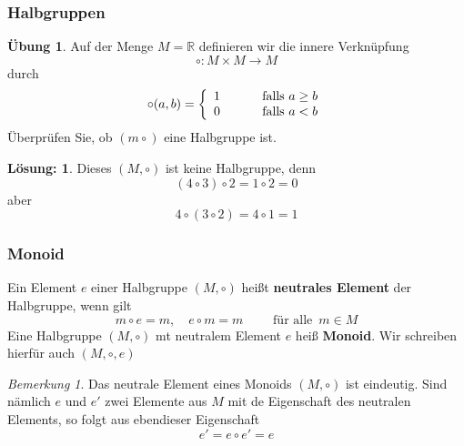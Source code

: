 \documentclass[hyperref={pdfpagelabels=false}]{beamer}
\theoremstyle{plain}%
\theoremstyle{definition}
\newtheorem*{uebung}{Übung}
\newtheorem*{sol}{Lösung:}
\theoremstyle{remark}
\newtheorem*{notiz}{Bemerkung}
\begin{document}
\begin{frame}
\frametitle{Halbgruppen}

\begin{uebung}
Auf der Menge $M = \mathbb R$ definieren wir die innere Verknüpfung
  	$$ \circ : M \times M \longrightarrow M $$
durch 
  	$$ \circ(a,b) = \left\{ \begin{array}{l c l} 1 & \quad & \textrm{ falls } a \geq b \\
	0 & & \textrm{ falls } a < b \end{array} \right. $$
Überprüfen Sie, ob $(m \circ)$ eine Halbgruppe ist.
\end{uebung}

\bigbreak

\pause \pause 

\begin{sol}
Dieses $(M, \circ )$ ist keine Halbgruppe, denn 
	$$ (4 \circ 3) \circ 2 = 1 \circ 2 = 0 $$
aber 
	$$ 4 \circ (3 \circ 2) = 4 \circ 1 = 1 $$ 
\end{sol}

\end{frame}

\begin{frame}
\frametitle{Monoid}

\begin{definition} Ein Element $e$ einer Halbgruppe $(M, \circ)$ heißt 
\textbf{neutrales Element} der Halbgruppe, wenn gilt 
  	$$ m \circ e = m, \quad e \circ m = m \qquad \textrm{ für alle }\, m \in M $$
Eine Halbgruppe $(M, \circ)$ mt neutralem Element $e$ heiß \textbf{Monoid}. Wir 
schreiben hierfür auch $(M, \circ, e)$
\end{definition}

\pause 

\begin{notiz} Das neutrale Element eines Monoids $(M,\circ)$ ist eindeutig. Sind nämlich $e$ und $e'$ zwei 
Elemente aus $M$ mit de Eigenschaft des neutralen Elements, so folgt aus ebendieser Eigenschaft
  	$$ e' = e \circ e' = e $$
\end{notiz}

\end{frame}
\end{document}

